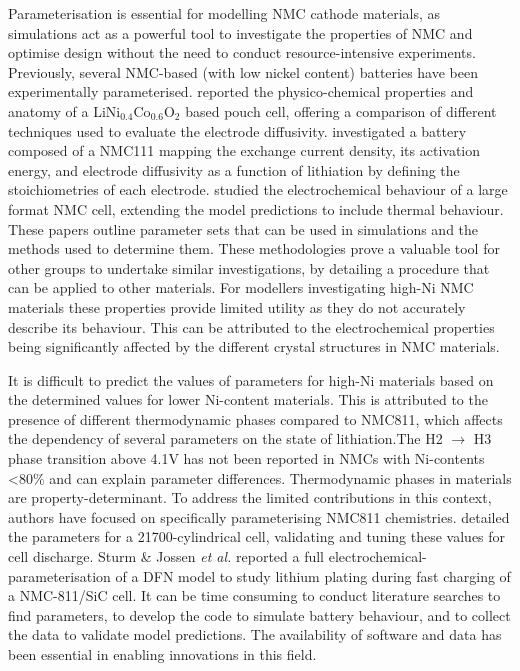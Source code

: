 \documentclass[journal=jacsat,manuscript=article]{achemso}
\begin{document}
Parameterisation is essential for modelling NMC cathode materials, as simulations act as a powerful tool to investigate the properties of NMC and optimise design without the need to conduct resource-intensive experiments.\cite{shearing_2020_3D} Previously, several NMC-based (with low nickel content) batteries have been experimentally parameterised. \cite{Ecker2015,Schmalstieg_Rahe_Ecker_Sauer_2018,Liebig_2019} \citeauthor{Ecker2015} reported the physico-chemical properties and anatomy of a LiNi$_{0.4}$Co$_{0.6}$O$_2$ based pouch cell, offering a comparison of different techniques used to evaluate the electrode diffusivity. \cite{Ecker2015} \citeauthor{Schmalstieg_Rahe_Ecker_Sauer_2018} investigated a battery composed of a NMC111 mapping the exchange current density, its activation energy, and electrode diffusivity as a function of lithiation by defining the stoichiometries of each electrode. \cite{Schmalstieg_Rahe_Ecker_Sauer_2018} \citeauthor{Liebig_2019} studied the electrochemical behaviour of a large format NMC cell, extending the model predictions to include thermal behaviour. \cite{Liebig_2019}  These papers outline parameter sets that can be used in simulations and the methods used to determine them. These methodologies prove a valuable tool for other groups to undertake similar investigations, by detailing a procedure that can be applied to other materials. For modellers investigating high-Ni NMC materials these properties provide limited utility as they do not accurately describe its behaviour. This can be attributed to the electrochemical properties being significantly affected by the different crystal structures in NMC materials.\cite{noh2013comparison} 

It is difficult to predict the values of parameters for high-Ni materials based on the determined values for lower Ni-content materials.\cite{Amin_Chiang_2016} This is attributed to the presence of different thermodynamic phases compared to NMC811, which affects the dependency of several parameters on the state of lithiation.The H2 $\rightarrow$ H3 phase transition above 4.1V has not been reported in NMCs with Ni-contents \textless80\% and can explain parameter differences.\cite{jung2017oxygen} Thermodynamic phases in materials are  property-determinant. To address the limited contributions in this context, authors have focused on specifically parameterising NMC811 chemistries. \citeauthor{Chen2020} detailed the parameters for a 21700-cylindrical cell, validating and tuning these values for cell discharge.\cite{Chen2020}  Sturm \& Jossen \textit{et al.} reported a full electrochemical-parameterisation of a DFN model to study lithium plating during fast charging of a NMC-811/SiC cell. \cite{Sturm2019b,Sturm2019} It can be time consuming to conduct literature searches to find parameters, to develop the code to simulate battery behaviour, and to collect the data to validate model predictions. The availability of software and data has been essential in enabling innovations in this field.
\end{document}
